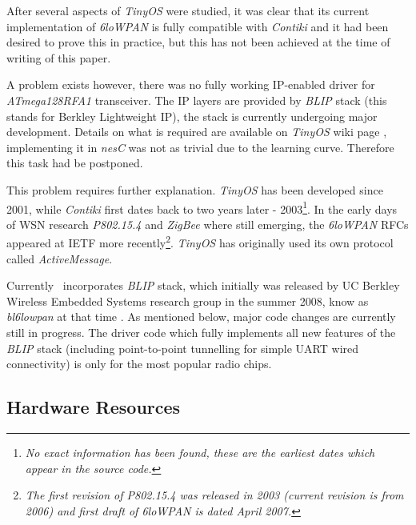   After several aspects of \emph{TinyOS} were studied, it was clear
 that its current implementation of \emph{6loWPAN} is fully compatible
 with \emph{Contiki} and it had been desired to prove this in practice,
 but this has not been achieved at the time of writing of this paper.
  
  A problem exists however, there was no fully working IP-enabled driver
 for \emph{ATmega128RFA1} transceiver. The IP layers are provided by
 \emph{BLIP} stack (this stands for Berkley Lightweight IP), the stack
 is currently undergoing major development. Details on what is required
 are available on \emph{TinyOS} wiki page \cite{tinyos:wiki:blip-2-0},
 implementing it in \emph{nesC} was not as trivial due to the learning
 curve. Therefore this task had be postponed.

  This problem requires further explanation. \emph{TinyOS} has been
 developed since 2001, while \emph{Contiki} first dates back to two
 years later - 2003\footnote{\emph{No exact information has been
 found, these are the earliest dates which appear in the source code.}}. 
 In the early days of WSN research \emph{P802.15.4} and \emph{ZigBee}
 where still emerging, the \emph{6loWPAN} RFCs appeared at IETF more
 recently\footnote{\emph{The first revision of P802.15.4 was released
 in 2003 (current revision is from 2006) and first draft of 6loWPAN
 is dated April 2007.}}. \emph{TinyOS} has originally used its own
 protocol called \emph{ActiveMessage}.

  Currently \TinyOS\ incorporates \emph{BLIP} stack, which initially
 was released by UC Berkley Wireless Embedded Systems research group
 in the summer 2008, know as \emph{bl6lowpan} at that time \cite{ucb:webs:blip}.
 As mentioned below, major code changes are currently still in progress.
 The driver code which fully implements all new features of the \emph{BLIP}
 stack (including point-to-point tunnelling for simple UART wired
 connectivity) is only for the most popular  radio chips.

\subsection{Hardware Resources}

